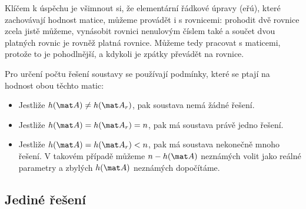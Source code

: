 Klíčem k úspěchu je všimnout si, že elementární řádkové úpravy (eřú), které zachovávají hodnost matice, můžeme provádět i s rovnicemi: prohodit dvě rovnice zcela jistě můžeme, vynásobit rovnici nenulovým číslem také a součet dvou platných rovnic je rovněž platná rovnice. Můžeme tedy pracovat s maticemi, protože to je pohodlnější, a kdykoli je zpátky převádět na rovnice.

Pro určení počtu řešení soustavy se používají podmínky, které se ptají na hodnost obou těchto matic:
\begin{itemize}
    \item Jestliže $h(\mat A) \neq h(\mat A_r)$, pak soustava nemá žádné řešení.
    \item Jestliže $h(\mat A) = h(\mat A_r) = n$, pak má soustava právě jedno řešení.
    \item Jestliže $h(\mat A) = h(\mat A_r) < n$, pak má soustava nekonečně mnoho řešení. V takovém případě můžeme $n - h(\mat A)$ neznámých volit jako reálné parametry a zbylých $h(\mat A)$ neznámých dopočítáme.
\end{itemize}

\subsection*{Jediné řešení}

